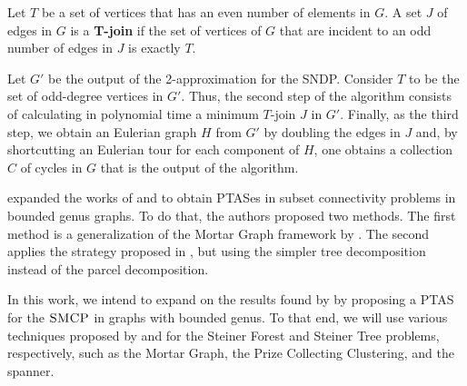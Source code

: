 Let \(T\) be a set of vertices that has an even number of elements in \(G\). A set \(J\) of edges in \(G\) is a \textbf{T-join} if the set of vertices of \(G\) that are incident to an odd number of edges in \(J\) is exactly \(T\).

Let \(G'\) be the output of the 2-approximation for the SNDP. Consider \(T\) to be the set of odd-degree vertices in \(G'\). Thus, the second step of the algorithm consists of calculating in polynomial time a minimum \(T\)-join \(J\) in \(G'\). Finally, as the third step, we obtain an Eulerian graph \(H\) from \(G'\) by doubling the edges in \(J\) and, by shortcutting an Eulerian tour for each component of \(H\), one obtains a collection \(C\) of cycles in \(G\) that is the output of the algorithm.


\cite{Borradaile2012} expanded the works of \cite{Borradaile2009b} and \cite{KleinTSP} to obtain PTASes in subset connectivity problems in bounded genus graphs. To do that, the authors proposed two methods. The first method is a generalization of the Mortar Graph framework by \cite{KleinTSP}. The second applies the strategy proposed in \cite{Borradaile2009b}, but using the simpler tree decomposition instead of the parcel decomposition.

In this work, we intend to expand on the results found by \cite{LINTZMAYER2020134} by proposing a PTAS for the \(\textsc{SMCP}\) in graphs with bounded genus. To that end, we will use various techniques proposed by \cite{Bateni} and \cite{Borradaile2009b} for the Steiner Forest and Steiner Tree problems, respectively, such as the Mortar Graph, the Prize Collecting Clustering, and the spanner.
